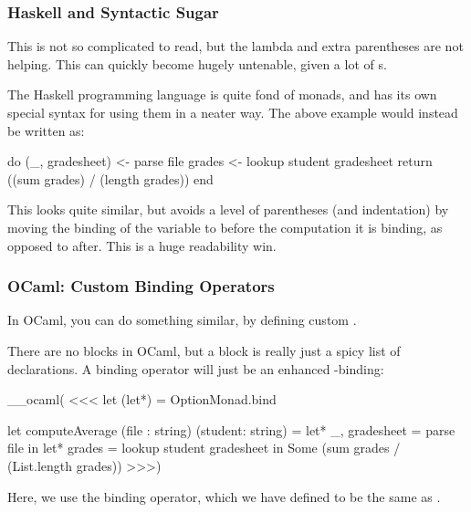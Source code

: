 \documentclass[aspectratio=169, handout]{beamer}
\begin{document}
\begin{frame}[fragile]
  \frametitle{Haskell and Syntactic Sugar}

  This is not so complicated to read, but the lambda and extra parentheses are not
  helping. This can quickly become hugely untenable, given a lot of s.

  \vspace{\fill}

  The Haskell programming language is quite fond of monads, and has its own
  special syntax for using them in a neater way. The above example would instead
  be written as:

  \vspace{\fill}

  \begin{codeblock}
    do
      (_, gradesheet) <- parse file
      grades <- lookup student gradesheet
      return ((sum grades) / (length grades))
    end
  \end{codeblock}

  \vspace{\fill}

  This looks quite similar, but avoids a level of parentheses (and indentation)
  by moving the binding of the  variable to before the computation it
  is binding, as opposed to after. This is a huge readability win.
\end{frame}

\begin{frame}[fragile]
  \frametitle{OCaml: Custom Binding Operators}

  In OCaml, you can do something similar, by defining custom .

  \vspace{\fill}

  There are no  blocks in OCaml, but a  block is really just a spicy
  list of declarations. A binding operator will just be an enhanced -binding:

  \vspace{\fill}

{\small
__ocaml(
<<<
  let (let*) = OptionMonad.bind

  let computeAverage (file : string) (student: string) =
    let* _, gradesheet = parse file in
    let* grades = lookup student gradesheet in
    Some (sum grades / (List.length grades))
>>>)
}

  \vspace{\fill}

  Here, we use the  binding operator, which we have defined to be the
  same as .
\end{frame}
\end{document}

